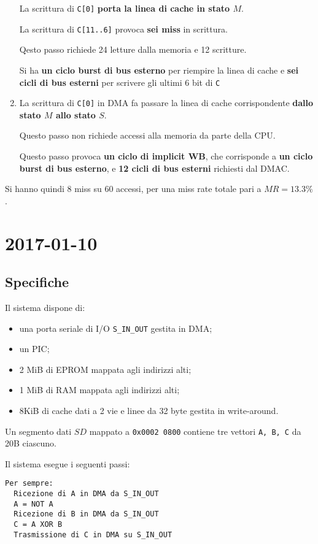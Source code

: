 \documentclass[a4paper]{article}
\begin{document}
\begin{enumerate}
La scrittura di \texttt{C[0]} \textbf{porta la linea di cache in stato $M$}.

La scrittura di \texttt{C[11..6]} provoca \textbf{sei miss} in scrittura.

Qesto passo richiede 24 letture dalla memoria e 12 scritture.

Si ha \textbf{un ciclo burst di bus esterno} per riempire la linea di cache e \textbf{sei cicli di bus esterni} per scrivere gli ultimi 6 bit di \texttt{C}

\item La scrittura di \texttt{C[0]} in DMA fa passare la linea di cache corrispondente \textbf{dallo stato $M$ allo stato $S$}.

Questo passo non richiede accessi alla memoria da parte della CPU.

Questo passo provoca \textbf{un ciclo di implicit WB}, che corrisponde a \textbf{un ciclo burst di bus esterno}, e \textbf{12 cicli di bus esterni} richiesti dal DMAC.


\end{enumerate}

Si hanno quindi 8 miss su 60 accessi, per una miss rate totale pari a $MR = 13.3\%$.

\section{2017-01-10}

\subsection{Specifiche}
Il sistema dispone di:

\begin{itemize}
\item una porta seriale di I/O \texttt{S\_IN\_OUT} gestita in DMA;
\item un PIC;
\item 2 MiB di EPROM mappata agli indirizzi alti;
\item 1 MiB di RAM mappata agli indirizzi alti;
\item 8KiB di cache dati a 2 vie e linee da 32 byte gestita in write-around.
\end{itemize}

Un segmento dati $SD$ mappato a \texttt{0x0002 0800} contiene tre vettori \texttt{A, B, C} da 20B ciascuno.

Il sistema esegue i seguenti passi:
\begin{verbatim}
Per sempre:
  Ricezione di A in DMA da S_IN_OUT
  A = NOT A
  Ricezione di B in DMA da S_IN_OUT
  C = A XOR B
  Trasmissione di C in DMA su S_IN_OUT
\end{verbatim}
\end{document}
